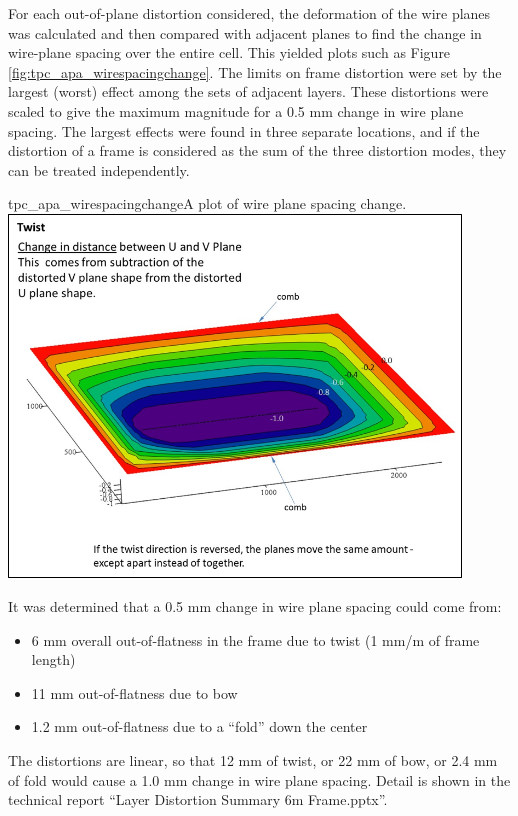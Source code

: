 For each out-of-plane distortion considered,  the deformation of the wire planes was calculated and then compared with adjacent planes to find the change in wire-plane spacing over the entire cell.  This yielded plots such as Figure \ref{fig:tpc_apa_wirespacingchange}.  The limits on frame distortion were set by the largest (worst) effect among the sets of adjacent layers.  These distortions were scaled to give the maximum magnitude for a 0.5 mm change in wire plane spacing. 
The largest effects were found in three separate locations, and if the distortion of a frame is considered as the sum of the three distortion modes, they can be treated independently.


\begin{cdrfigure}{tpc_apa_wirespacingchange}{A plot of wire plane spacing change.}
\includegraphics[width=0.9\textwidth]{figures/tpc_apa_wirespacingchange.png} 
\end{cdrfigure}

It was determined that a 0.5 mm change in wire plane spacing could come from:
\begin{itemize}
\item{6 mm overall out-of-flatness in the frame due to twist (1 mm/m of frame length)}
\item{11 mm out-of-flatness due to bow}
\item{1.2 mm out-of-flatness due to a ``fold'' down the center}
\end{itemize}
    
The distortions are  %
linear, so that 12 mm of twist, or 22 mm of bow, or 2.4 mm of fold would cause a 1.0 mm change in wire plane spacing.
Detail is shown in the technical report ``Layer Distortion Summary 6m Frame.pptx''. 


